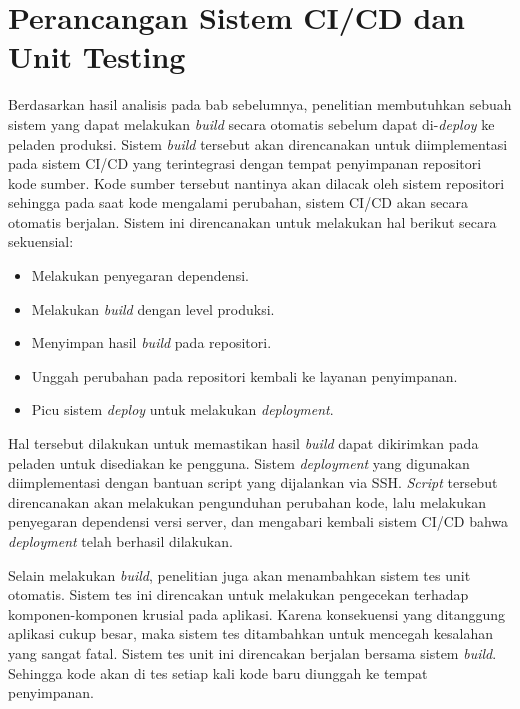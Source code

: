 \section{Perancangan Sistem CI/CD dan Unit Testing}
    Berdasarkan hasil analisis pada bab sebelumnya, penelitian membutuhkan
    sebuah sistem yang dapat melakukan \textit{build} secara otomatis sebelum
    dapat di-\textit{deploy} ke peladen produksi. Sistem \textit{build} tersebut
    akan direncanakan untuk diimplementasi pada sistem CI/CD yang terintegrasi
    dengan tempat penyimpanan repositori kode sumber. Kode sumber tersebut
    nantinya akan dilacak oleh sistem repositori sehingga pada saat kode
    mengalami perubahan, sistem CI/CD akan secara otomatis berjalan. Sistem ini
    direncanakan untuk melakukan hal berikut secara sekuensial:
    
    \begin{itemize}
        \item Melakukan penyegaran dependensi.
        \item Melakukan \textit{build} dengan level produksi.
        \item Menyimpan hasil \textit{build} pada repositori.
        \item Unggah perubahan pada repositori kembali ke layanan penyimpanan.
        \item Picu sistem \textit{deploy} untuk melakukan \textit{deployment}.
    \end{itemize}
    
    Hal tersebut dilakukan untuk memastikan hasil \textit{build} dapat
    dikirimkan pada peladen untuk disediakan ke pengguna. Sistem
    \textit{deployment} yang digunakan diimplementasi dengan bantuan script yang
    dijalankan via SSH. \textit{Script} tersebut direncanakan akan melakukan
    pengunduhan perubahan kode, lalu melakukan penyegaran dependensi versi
    server, dan mengabari kembali sistem CI/CD bahwa \textit{deployment} telah
    berhasil dilakukan.
    
    Selain melakukan \textit{build}, penelitian juga akan menambahkan sistem tes
    unit otomatis. Sistem tes ini direncakan untuk melakukan pengecekan terhadap
    komponen-komponen krusial pada aplikasi. Karena konsekuensi yang ditanggung
    aplikasi cukup besar, maka sistem tes ditambahkan untuk mencegah kesalahan
    yang sangat fatal. Sistem tes unit ini direncakan berjalan bersama sistem
    \textit{build}. Sehingga kode akan di tes setiap kali kode baru diunggah ke
    tempat penyimpanan.